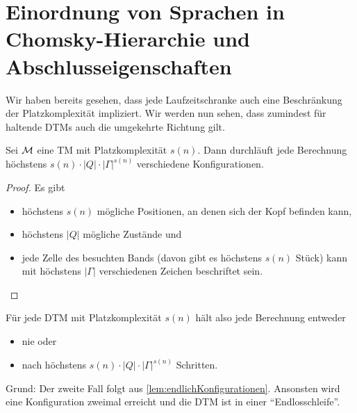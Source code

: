 {%










\newpage

\section{Einordnung von Sprachen in Chomsky-Hierarchie und Abschlusseigenschaften}

Wir haben bereits gesehen, dass jede Laufzeitschranke auch eine Beschränkung der Platzkomplexität impliziert.
Wir werden nun sehen, dass zumindest für haltende \ac{DTM}s auch die umgekehrte Richtung gilt.
\begin{lemma}\label{lem:endlichKonfigurationen}
 Sei $\mathcal{M}$ eine \ac{TM} mit Platzkomplexität $s(n)$.
 Dann durchläuft jede Berechnung höchstens $s(n)\cdot |Q| \cdot |\Gamma|^{s(n)}$
 verschiedene Konfigurationen.
\end{lemma}
\begin{proof}
 Es gibt 
 \begin{itemize}
  \item höchstens $s(n)$ mögliche Positionen, an denen sich der Kopf befinden kann,
  \item höchstens $|Q|$ mögliche Zustände und
  \item jede Zelle des besuchten Bands (davon gibt es höchstens $s(n)$ Stück) kann mit höchstens $|\Gamma|$ verschiedenen Zeichen beschriftet sein. \qedhere
 \end{itemize}
\end{proof}

\begin{Bemerkung}
 Für jede \ac{DTM} mit Platzkomplexität $s(n)$ hält also jede Berechnung entweder
 \begin{itemize}
  \item nie oder
  \item nach höchstens $s(n)\cdot |Q| \cdot |\Gamma|^{s(n)}$ Schritten.
 \end{itemize}
Grund: Der zweite Fall folgt aus \autoref{lem:endlichKonfigurationen}. Ansonsten wird eine Konfiguration zweimal erreicht und die \ac{DTM} ist in einer "`Endlosschleife"'.
\end{Bemerkung}


}
